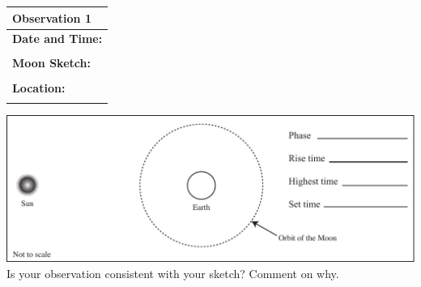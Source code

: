 \documentclass[11pt]{article}
\begin{document}
\noindent
\begin{minipage}{4.5cm}
\begin{center}
\begin{tabular}{|l|}
\hline 
 \textbf{Observation 1}
 \\
 \hline\hline
\textbf{Date and Time:}\quad\quad\quad\quad\\
\parbox{0.3\linewidth}{\vspace*{1cm}\hspace*{4cm}}
\\
\textbf{Moon Sketch:} \\
\parbox{0.3\linewidth}{\vspace*{3.5cm}\hspace*{4cm}}
\\
\textbf{Location:} \\
\parbox{0.3\linewidth}{\vspace*{1cm}\hspace*{4cm}}
\\\hline
\end{tabular}
\end{center}
\end{minipage}
\begin{minipage}{0.75\textwidth}
\includegraphics[width=\textwidth]{moon_position_in_orbit_blank}\\
\vspace*{0.5cm}
Is your observation consistent with your sketch? Comment on why.\\

\vspace*{1cm}
\hrulefill
\end{minipage}
\end{document}
